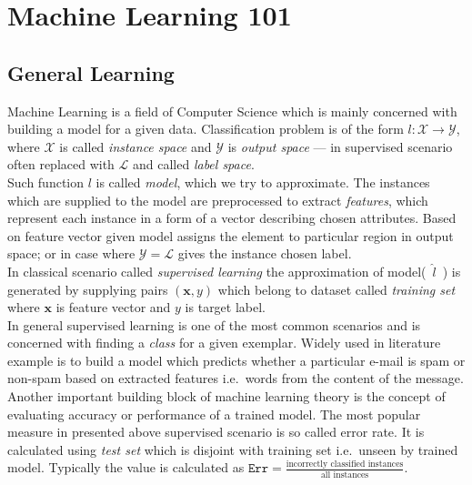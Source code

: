 \documentclass[12pt, a4paper, pdflatex, leqno]{report}
\begin{document}
\section{Machine Learning 101}
\subsection{General Learning}
Machine Learning is a field of Computer Science which is mainly concerned with building a model for a given data. Classification problem is of the form $\mathit{l} : \mathscr{X} \rightarrow \mathscr{Y}$, where $\mathscr{X}$ is called \emph{instance space} and $\mathscr{Y}$ is \emph{output space} --- in supervised scenario often replaced with $\mathscr{L}$ and called \emph{label space}.\\
Such function $\mathit{l}$ is called \emph{model}, which we try to approximate. The instances which are supplied to the model are preprocessed to extract \emph{features}, which represent each instance in a form of a vector describing chosen attributes. Based on feature vector given model assigns the element to particular region in output space; or in case where $\mathscr{Y} = \mathscr{L}$ gives the instance chosen label.\\

In classical scenario called \emph{supervised learning} the approximation of model(~$\mathit{\hat{l}}$~) is generated by supplying pairs $(\mathit{\mathbf{x}}, \mathit{y})$ which belong to dataset called \emph{training set} where $\mathit{\mathbf{x}}$ is feature vector and $\mathit{y}$ is target label.\\
In general supervised learning is one of the most common scenarios and is concerned with finding a \emph{class} for a given exemplar. Widely used in literature example is to build a model which predicts whether a particular e-mail is spam or non-spam based on extracted features i.e.\ words from the content of the message.\\

Another important building block of machine learning theory is the concept of evaluating accuracy or performance of a trained model. The most popular measure in presented above supervised scenario is so called error rate. It is calculated using \emph{test set} which is disjoint with training set i.e.\ unseen by trained model. Typically the value is calculated as $\mathtt{Err} = \frac{\text{incorrectly classified instances}}{\text{all instances}}$.\\
\end{document}
